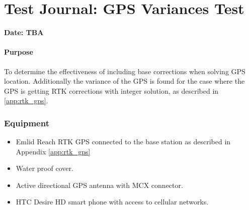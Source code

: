\chapter{Test Journal: GPS Variances Test} \label{app:GPSImprovement}

\textbf{Date: TBA}

\subsubsection*{Purpose}
To determine the effectiveness of including base corrections when solving GPS location. Additionally the variance of the GPS is found for the case where the GPS is getting RTK corrections with integer solution, as described in \autoref{app:rtk_gps}.

\subsection*{Equipment}
\begin{itemize}
	\item Emlid Reach RTK GPS connected to the base station as described in Appendix \ref{app:rtk_gps}
  \item Water proof cover.
  \item Active directional GPS antenna with MCX connector.
  \item HTC Desire HD smart phone with access to cellular networks.
\end{itemize}

